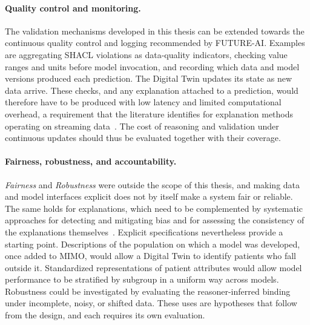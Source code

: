 \paragraph{Quality control and monitoring.}
The validation mechanisms developed in this thesis can be extended towards the continuous quality control and logging recommended by FUTURE-AI. Examples are aggregating SHACL violations as data-quality indicators, checking value ranges and units before model invocation, and recording which data and model versions produced each prediction. The Digital Twin updates its state as new data arrive. These checks, and any explanation attached to a prediction, would therefore have to be produced with low latency and limited computational overhead, a requirement that the literature identifies for explanation methods operating on streaming data~\cite{mathew_recent_2025}. The cost of reasoning and validation under continuous updates should thus be evaluated together with their coverage.

\paragraph{Fairness, robustness, and accountability.}
\emph{Fairness} and \emph{Robustness} were outside the scope of this thesis, and making data and model interfaces explicit does not by itself make a system fair or reliable. The same holds for explanations, which need to be complemented by systematic approaches for detecting and mitigating bias and for assessing the consistency of the explanations themselves~\cite{s_band_application_2023}. Explicit specifications nevertheless provide a starting point. Descriptions of the population on which a model was developed, once added to MIMO, would allow a Digital Twin to identify patients who fall outside it. Standardized representations of patient attributes would allow model performance to be stratified by subgroup in a uniform way across models. Robustness could be investigated by evaluating the reasoner-inferred binding under incomplete, noisy, or shifted data. These uses are hypotheses that follow from the design, and each requires its own evaluation.

